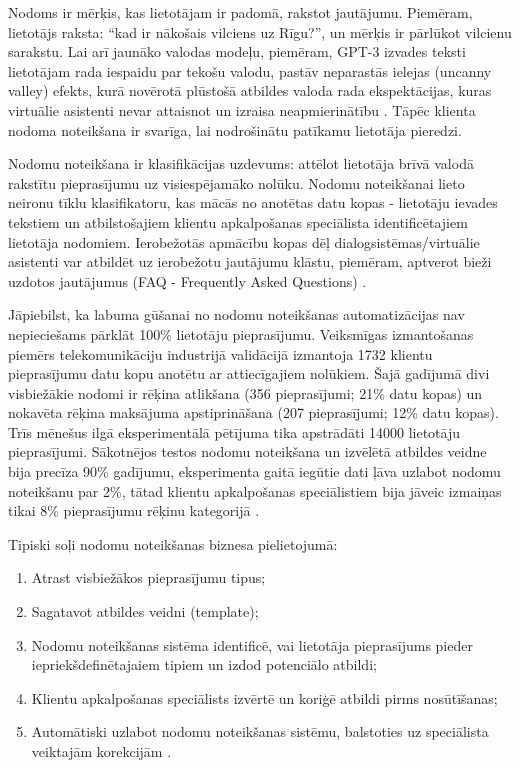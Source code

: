 
Nodoms ir mērķis, kas lietotājam ir padomā, rakstot jautājumu. Piemēram, lietotājs raksta: “kad ir nākošais vilciens uz Rīgu?”, un mērķis ir pārlūkot vilcienu sarakstu. Lai arī jaunāko valodas modeļu, piemēram, GPT-3 izvades teksti lietotājam rada iespaidu par tekošu valodu, pastāv neparastās ielejas (uncanny valley) efekts, kurā novērotā plūstošā atbildes valoda rada ekspektācijas, kuras virtuālie asistenti nevar attaisnot un izraisa neapmierinātību \cite{paikens2020}. Tāpēc klienta nodoma noteikšana ir svarīga, lai nodrošinātu patīkamu lietotāja pieredzi.

Nodomu noteikšana ir klasifikācijas uzdevums: attēlot lietotāja brīvā valodā rakstītu pieprasījumu uz visiespējamāko nolūku. Nodomu noteikšanai lieto neironu tīklu klasifikatoru, kas mācās no anotētas datu kopas - lietotāju ievades tekstiem un atbilstošajiem klientu apkalpošanas speciālista identificētajiem lietotāja nodomiem. Ierobežotās apmācību kopas dēļ dialogsistēmas/virtuālie asistenti var atbildēt uz ierobežotu jautājumu klāstu, piemēram, aptverot bieži uzdotos jautājumus (FAQ - Frequently Asked Questions) \cite{fasttext2019}.

Jāpiebilst, ka labuma gūšanai no nodomu noteikšanas automatizācijas nav nepieciešams pārklāt 100\% lietotāju pieprasījumu. Veiksmīgas izmantošanas piemērs telekomunikāciju industrijā validācijā izmantoja 1732 klientu pieprasījumu datu kopu anotētu ar attiecīgajiem nolūkiem. Šajā gadījumā divi visbiežākie nodomi ir rēķina atlikšana (356 pieprasījumi; 21\% datu kopas) un nokavēta rēķina maksājuma apstiprināšana (207 pieprasījumi; 12\% datu kopas). Trīs mēnešus ilgā eksperimentālā pētījuma tika apstrādāti 14000 lietotāju pieprasījumi. Sākotnējos testos nodomu noteikšana un izvēlētā atbildes veidne bija precīza 90\% gadījumu, eksperimenta gaitā iegūtie dati ļāva uzlabot nodomu noteikšanu par 2\%, tātad klientu apkalpošanas speciālistiem bija jāveic izmaiņas tikai 8\% pieprasījumu rēķinu kategorijā \cite{paikens2020}.

Tipiski soļi nodomu noteikšanas biznesa pielietojumā:
\begin{enumerate}
	\item Atrast visbiežākos pieprasījumu tipus;
	\item Sagatavot atbildes veidni (template);
	\item Nodomu noteikšanas sistēma identificē, vai lietotāja pieprasījums pieder iepriekšdefinētajaiem tipiem un izdod potenciālo atbildi;
	\item Klientu apkalpošanas speciālists izvērtē un koriģē atbildi pirms nosūtīšanas;
	\item Automātiski uzlabot nodomu noteikšanas sistēmu, balstoties uz speciālista veiktajām korekcijām \cite{paikens2020}.
\end{enumerate}
